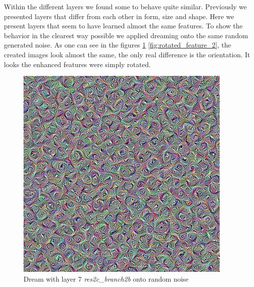 Within the different layers we found some to behave quite similar.
Previously we presented layers that differ from each other in form, size and shape.
Here we present layers that seem to have learned almost the same features.
To show the behavior in the clearest way possible we applied dreaming onto the same random generated noise.
As one can see in the figures \ref{fig:rotated_feature_1} \ref{fig:rotated_feature_2}, the created images look almost the same, the only real difference is the orientation.
It looks the enhanced features were simply rotated.

\begin{figure}[H]
	\centering
	\includegraphics[width=1\linewidth]{img/rotated_feature_1.jpg}
	\caption{Dream with layer 7 \emph{res2c\_branch2b} onto random noise}
	\label{fig:rotated_feature_1}
	\endminipage\hfill
	\centering

\end{figure}
